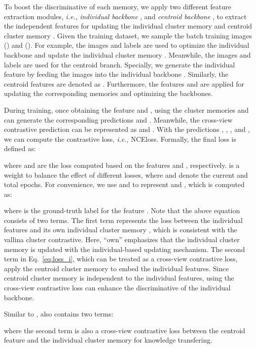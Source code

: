 \documentclass[10pt,twocolumn,letterpaper]{article}
\begin{document}
To boost the discriminative of each memory, we apply two different feature extraction modules, \emph{i.e.,} \emph{individual backbone} , and \emph{centroid backbone} , to extract the independent features for updating the individual cluster memory  and centroid cluster memory .
Given the training dataset, we sample the batch training images () and (). 
For example, the images  and labels  are used to optimize the individual backbone  and update the individual cluster memory .
Meanwhile, the images  and labels  are used for the centroid branch.
Specially, we generate the individual feature  by feeding the images  into the individual backbone .
Similarly, the centroid features are denoted as .
Furthermore,  the features  and  are applied for updating the corresponding memories and optimizing the backbones.

During training, once obtaining the feature  and , using the cluster memories  and  can generate the corresponding predictions  and  .
Meanwhile, the cross-view contrastive prediction can be represented as  and  .
With the predictions , , , and , we can compute the contrastive loss, \emph{i.e.,} NCEloss.
Formally, the final loss  is defined as:
 
where  and  are the loss computed based on the features  and , respectively. 
 is a weight to balance the effect of different losses, where  and  denote the current and total epochs.
For convenience, we use  and  to represent  and , which is computed as:

where  is the ground-truth label for the feature .
Note that the above equation consists of two terms. 
The first term represents the loss between the individual features  and its own individual cluster memory , which is consistent with the vallina cluster contrastive. 
Here, ``own” emphasizes that the  individual cluster memory is updated with the individual-based updating mechanism.
The second term in Eq.~\eqref{eq:loss_i}, which can be treated as a cross-view contrastive loss, apply the centroid cluster memory to embed the individual features.
Since centroid cluster memory is independent to the individual features,  using the cross-view contrastive loss can enhance the discriminative of the individual backbone.

Similar to ,  also contains two terms:

where the second term is also a cross-view contrastive loss between the centroid feature  and the individual cluster memory  for knowledge transfering.
\end{document}
